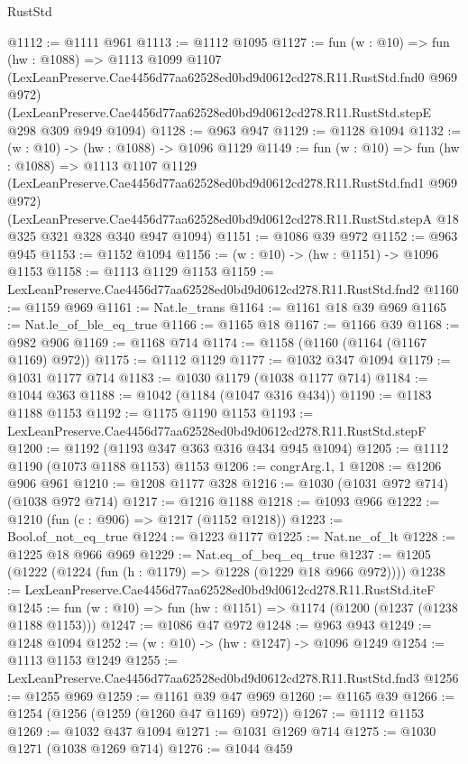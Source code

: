 \begin{lexlean}{RustStd}
\begin{coremodule}
@1112 := @1111 @961
@1113 := @1112 @1095
@1127 := fun (w : @10) =>
  fun (hw : @1088) =>
  @1113
    @1099
    @1107
    (LexLeanPreserve.Cae4456d77aa62528ed0bd9d0612cd278.R11.RustStd.fnd0 @969 @972)
    (LexLeanPreserve.Cae4456d77aa62528ed0bd9d0612cd278.R11.RustStd.stepE @298 @309 @949 @1094)
@1128 := @963 @947
@1129 := @1128 @1094
@1132 := (w : @10) -> (hw : @1088) -> @1096 @1129
@1149 := fun (w : @10) =>
  fun (hw : @1088) =>
  @1113
    @1107
    @1129
    (LexLeanPreserve.Cae4456d77aa62528ed0bd9d0612cd278.R11.RustStd.fnd1 @969 @972)
    (LexLeanPreserve.Cae4456d77aa62528ed0bd9d0612cd278.R11.RustStd.stepA
      @18
      @325
      @321
      @328
      @340
      @947
      @1094)
@1151 := @1086 @39 @972
@1152 := @963 @945
@1153 := @1152 @1094
@1156 := (w : @10) -> (hw : @1151) -> @1096 @1153
@1158 := @1113 @1129 @1153
@1159 := LexLeanPreserve.Cae4456d77aa62528ed0bd9d0612cd278.R11.RustStd.fnd2
@1160 := @1159 @969
@1161 := Nat.le_trans
@1164 := @1161 @18 @39 @969
@1165 := Nat.le_of_ble_eq_true
@1166 := @1165 @18
@1167 := @1166 @39
@1168 := @982 @906
@1169 := @1168 @714
@1174 := @1158 (@1160 (@1164 (@1167 @1169) @972))
@1175 := @1112 @1129
@1177 := @1032 @347 @1094
@1179 := @1031 @1177 @714
@1183 := @1030 @1179 (@1038 @1177 @714)
@1184 := @1044 @363
@1188 := @1042 (@1184 (@1047 @316 @434))
@1190 := @1183 @1188 @1153
@1192 := @1175 @1190 @1153
@1193 := LexLeanPreserve.Cae4456d77aa62528ed0bd9d0612cd278.R11.RustStd.stepF
@1200 := @1192 (@1193 @347 @363 @316 @434 @945 @1094)
@1205 := @1112 @1190 (@1073 @1188 @1153) @1153
@1206 := congrArg.{1, 1}
@1208 := @1206 @906 @961
@1210 := @1208 @1177 @328
@1216 := @1030 (@1031 @972 @714) (@1038 @972 @714)
@1217 := @1216 @1188
@1218 := @1093 @966
@1222 := @1210 (fun (c : @906) => @1217 (@1152 @1218))
@1223 := Bool.of_not_eq_true
@1224 := @1223 @1177
@1225 := Nat.ne_of_lt
@1228 := @1225 @18 @966 @969
@1229 := Nat.eq_of_beq_eq_true
@1237 := @1205 (@1222 (@1224 (fun (h : @1179) => @1228 (@1229 @18 @966 @972))))
@1238 := LexLeanPreserve.Cae4456d77aa62528ed0bd9d0612cd278.R11.RustStd.iteF
@1245 := fun (w : @10) => fun (hw : @1151) => @1174 (@1200 (@1237 (@1238 @1188 @1153)))
@1247 := @1086 @47 @972
@1248 := @963 @943
@1249 := @1248 @1094
@1252 := (w : @10) -> (hw : @1247) -> @1096 @1249
@1254 := @1113 @1153 @1249
@1255 := LexLeanPreserve.Cae4456d77aa62528ed0bd9d0612cd278.R11.RustStd.fnd3
@1256 := @1255 @969
@1259 := @1161 @39 @47 @969
@1260 := @1165 @39
@1266 := @1254 (@1256 (@1259 (@1260 @47 @1169) @972))
@1267 := @1112 @1153
@1269 := @1032 @437 @1094
@1271 := @1031 @1269 @714
@1275 := @1030 @1271 (@1038 @1269 @714)
@1276 := @1044 @459

\end{coremodule}
\end{lexlean}
